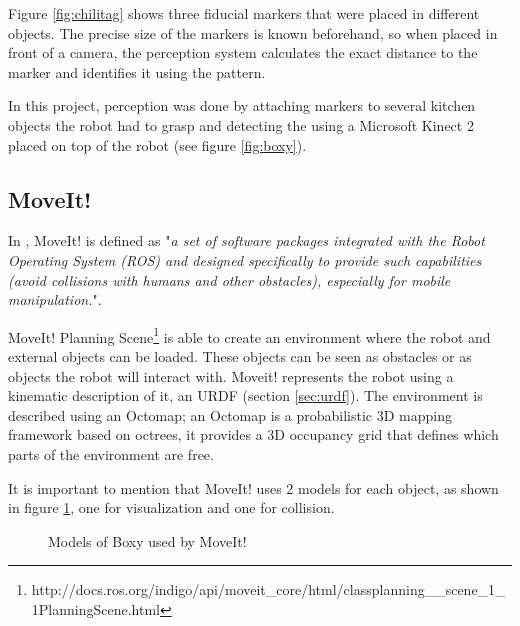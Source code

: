 Figure \ref{fig:chilitag} shows three fiducial markers that were placed in different objects. The precise size of the markers is known beforehand, so when placed in front of a camera, the perception system calculates the exact distance to the marker and identifies it using the pattern.

In this project, perception was done by attaching markers to several kitchen objects the robot had to grasp and detecting the using a Microsoft Kinect 2 placed on top of the robot (see figure \ref{fig:boxy}).

\subsection{MoveIt!}
\label{subsec:moveit}

In \citet{moveit}, MoveIt! is defined as "\textit{a set of software	packages integrated with the Robot Operating System (ROS) and designed specifically to provide such capabilities (avoid collisions with humans and other obstacles), especially for mobile manipulation.}".

MoveIt! Planning Scene\footnote{http://docs.ros.org/indigo/api/moveit\_core/html/classplanning\_\_scene\_1\_1PlanningScene.html} is able to create an environment where the robot and external objects can be loaded. These objects can be seen as obstacles or as objects the robot will interact with. Moveit! represents the robot using a kinematic description of it, an URDF (section \ref{sec:urdf}). The environment is described using an Octomap; an Octomap is a probabilistic 3D mapping framework based on octrees, it provides a 3D occupancy grid that defines which parts of the environment are free.

It is important to mention that MoveIt! uses 2 models for each object, as shown in figure \ref{fig:models}, one for visualization and one for collision. 
\begin{figure}[H]
	\centering
	\begin{subfigure}[][Visualization Model]
		{\texttt{[image: boxy/visual.png]}}
	\end{subfigure}
	\begin{subfigure}[][Collision Model]
		{\texttt{[image: boxy/collision.png]}}
	\end{subfigure}
	\vspace{-15pt}
	\caption{Models of Boxy used by MoveIt!}
	\vspace{-10pt}
	\label{fig:models}
\end{figure}

